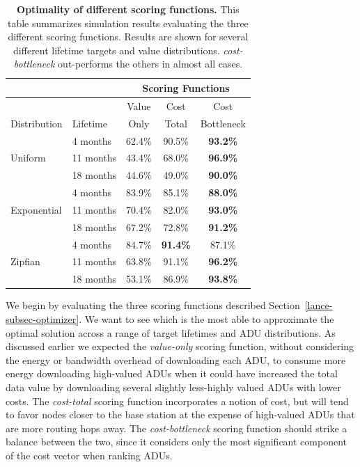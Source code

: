 \begin{table}[t]
\begin{center}
\begin{tabular}{|l|l|ccc|}
\hline
& & \multicolumn{3}{|c|}{Scoring Functions} \\ \hline
& & Value & Cost & Cost \\
Distribution & Lifetime & Only & Total & Bottleneck \\ \hline
\multirow{3}{*}{Uniform} & 4 months & 62.4\% & 90.5\% & \textbf{93.2\%} \\
& 11 months & 43.4\% & 68.0\% & \textbf{96.9\%} \\
& 18 months & 44.6\% & 49.0\% & \textbf{90.0\%} \\ \hline
\multirow{3}{*}{Exponential} & 4 months & 83.9\% & 85.1\% & \textbf{88.0\%}
\\
& 11 months & 70.4\% & 82.0\% & \textbf{93.0\%} \\
& 18 months & 67.2\% & 72.8\% & \textbf{91.2\%} \\ \hline
\multirow{3}{*}{Zipfian} & 4 months & 84.7\% & \textbf{91.4\%} & 87.1\% \\
& 11 months & 63.8\% & 91.1\% & \textbf{96.2\%} \\
& 18 months & 53.1\% & 86.9\% & \textbf{93.8\%} \\ \hline
\end{tabular}
\end{center}

\caption{\textbf{Optimality of different scoring functions.} This table
summarizes simulation results evaluating the three different scoring
functions. Results are shown for several different lifetime targets and value
distributions. \textit{cost-bottleneck} out-performs the others in almost all
cases.}

\label{lance-fig-table}
\end{table}

We begin by evaluating the three scoring functions described
Section~\ref{lance-subsec-optimizer}. We want to see which is the most able
to approximate the optimal solution across a range of target lifetimes and
ADU distributions. As discussed earlier we expected the \textit{value-only}
scoring function, without considering the energy or bandwidth overhead of
downloading each ADU, to consume more energy downloading high-valued ADUs
when it could have increased the total data value by downloading several
slightly less-highly valued ADUs with lower costs. The \textit{cost-total}
scoring function incorporates a notion of cost, but will tend to favor nodes
closer to the base station at the expense of high-valued ADUs that are more
routing hops away. The \textit{cost-bottleneck} scoring function should
strike a balance between the two, since it considers only the most
significant component of the cost vector when ranking ADUs.

